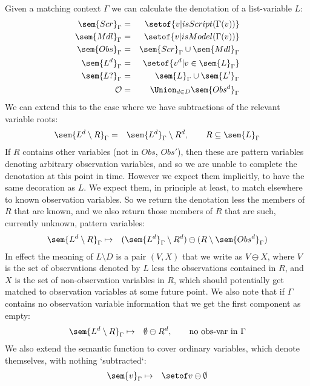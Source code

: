 Given a matching context $\Gamma$ we can calculate the denotation
of a list-variable $L$:
\begin{eqnarray*}
   \sem{Scr}_\Gamma &=& \setof{ v | isScript(\Gamma(v))}
\\ \sem{Mdl}_\Gamma &=& \setof{ v | isModel(\Gamma(v))}
\\ \sem{Obs}_\Gamma &=& \sem{Scr}_\Gamma \cup \sem{Mdl}_\Gamma
\\ \sem{L^d}_\Gamma &=& \setof{ v^d | v \in \sem{L}_\Gamma}
\\ \sem{L?}_\Gamma &=& \sem{L}_\Gamma \cup \sem{L'}_\Gamma
\\ \mathcal O &=& \Union_{d \in D}\sem{Obs^d}_\Gamma
\end{eqnarray*}
We can extend this to the case where we have subtractions
of the relevant variable roots:
\begin{eqnarray*}
   \sem{L^d\setminus R}_\Gamma
   &=&
   \sem{L^d}_\Gamma \setminus R^d
  , \qquad R \subseteq \sem{L}_\Gamma
\end{eqnarray*}
If $R$ contains other variables (not in $Obs$, $Obs'$),
then these are pattern variables denoting arbitrary
observation variables, and so we are unable to complete
the denotation at this point in time.
However we expect them implicitly, to have the same decoration
as $L$.
We expect them, in principle at least, to match elsewhere to
known observation variables.
So we return the denotation less the members of $R$
that are known, and we also return those members of $R$
that are such, currently unknown, pattern variables:
\begin{eqnarray*}
   \sem{L^d\setminus R}_\Gamma &\mapsto &
   (\sem{L^d}_\Gamma \setminus R^d) \ominus (R \setminus \sem{Obs^d}_\Gamma )
\end{eqnarray*}
In effect the meaning of $L\setminus D$ is a pair $(V,X)$
that we write as $V \ominus X$,
where $V$ is the set of observations denoted by $L$
less the observations contained in $R$, and $X$ is the set of non-observation
variables in $R$, which should potentially
get matched to observation variables at some future point.
We also note that if $\Gamma$ contains no observation variable information
that we get the first component as empty:
\begin{eqnarray*}
   \sem{L^d\setminus R}_\Gamma &\mapsto &
   \emptyset \ominus R^d, \qquad \mbox{no obs-var in }\Gamma
\end{eqnarray*}
We also extend the semantic function to cover ordinary variables,
which denote themselves, with nothing `subtracted`:
\begin{eqnarray*}
   \sem{v}_\Gamma &\mapsto &
   \setof v \ominus  \emptyset
\end{eqnarray*}

